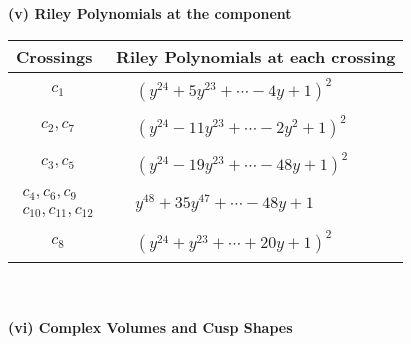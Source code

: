 \documentclass[1p]{elsarticle_modified}
\theoremstyle{definition}
\begin{document}
\newpage\renewcommand{\arraystretch}{1}
\flushleft \textbf{(v) Riley Polynomials at the component}\newline \\
\begin{tabular}{m{50pt}|m{274pt}}
Crossings & \hspace{64pt}Riley Polynomials at each crossing \\
\hline $$\begin{aligned}c_{1}\end{aligned}$$&$\begin{aligned}
&(y^{24}+5 y^{23}+\cdots-4 y+1)^{2}
\end{aligned}$\\
\hline $$\begin{aligned}c_{2},c_{7}\end{aligned}$$&$\begin{aligned}
&(y^{24}-11 y^{23}+\cdots-2 y^2+1)^{2}
\end{aligned}$\\
\hline $$\begin{aligned}c_{3},c_{5}\end{aligned}$$&$\begin{aligned}
&(y^{24}-19 y^{23}+\cdots-48 y+1)^{2}
\end{aligned}$\\
\hline $$\begin{aligned}c_{4},c_{6},c_{9}\\c_{10},c_{11},c_{12}\end{aligned}$$&$\begin{aligned}
&y^{48}+35 y^{47}+\cdots-48 y+1
\end{aligned}$\\
\hline $$\begin{aligned}c_{8}\end{aligned}$$&$\begin{aligned}
&(y^{24}+y^{23}+\cdots+20 y+1)^{2}
\end{aligned}$\\
\hline
\end{tabular}\\~\\
\newpage\flushleft \textbf{(vi) Complex Volumes and Cusp Shapes}
\end{document}
